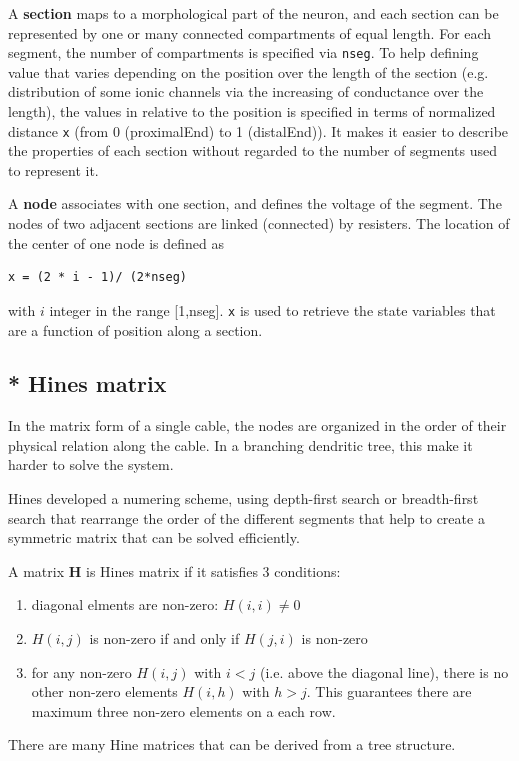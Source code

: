 A {\bf section} maps to a morphological part of the neuron, and each section can
be represented by one or many connected compartments of equal length. For
each segment, the number of compartments is specified via \verb!nseg!. To help
defining value that varies depending on the position over the length of the
section (e.g. distribution of some ionic channels via the increasing of
conductance over the length), the values in relative to the position is
specified in terms of normalized distance \verb!x! (from 0 (proximalEnd) to 1
(distalEnd)). It makes it easier to describe the properties of each section
without regarded to the number of segments used to represent it.

A {\bf node} associates with one section, and defines the voltage of the
segment. The nodes of two adjacent sections are linked (connected) by resisters.
The location of the center of one node is defined as
\begin{verbatim}
x = (2 * i - 1)/ (2*nseg)
\end{verbatim}
with $i$ integer in the range [1,nseg]. \verb!x! is used
to retrieve the state variables that are a function of position along a section.

\subsection{* Hines matrix}
\label{sec:Hines-matrix}

In the matrix form of a single cable, the nodes are organized in the
order of their physical relation along the cable. In a branching dendritic tree,
this make it harder to solve the system.

Hines developed a numering scheme, using depth-first search or breadth-first
search that rearrange the order of the different segments that help to create a
symmetric matrix that can be solved efficiently.

\begin{mdframed}
A matrix {\bf H} is Hines matrix if it satisfies 3 conditions:
\begin{enumerate}
  \item diagonal elments are non-zero: $H(i,i) \ne 0$
  \item $H(i,j)$ is non-zero if and only if $H(j,i)$ is non-zero
  \item for any non-zero $H(i,j)$ with $i<j$ (i.e. above the diagonal line),
  there is no other non-zero elements $H(i,h)$ with $h>j$. This guarantees there
  are maximum three non-zero elements on a each row.
\end{enumerate}

There are many Hine matrices that can be derived from a tree structure.
\end{mdframed}

